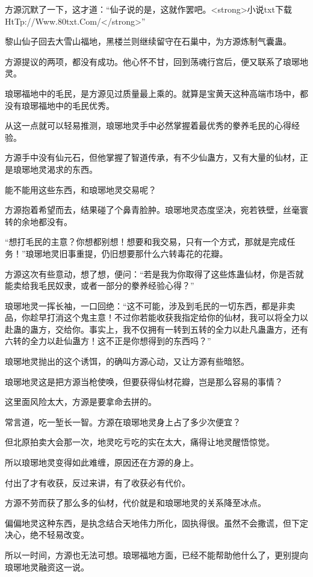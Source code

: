 \begin{this_body}
方源沉默了一下，这才道：“仙子说的是，这就作罢吧。<strong>小说txt下载HtTp://Www.80txt.Com/</strong>”

黎山仙子回去大雪山福地，黑楼兰则继续留守在石巢中，为方源炼制气囊蛊。

方源提议的两项，都没有成功。他心怀不甘，回到荡魂行宫后，便又联系了琅琊地灵。

琅琊福地中的毛民，是方源见过质量最上乘的。就算是宝黄天这种高端市场中，都没有琅琊福地中的毛民优秀。

从这一点就可以轻易推测，琅琊地灵手中必然掌握着最优秀的豢养毛民的心得经验。

方源手中没有仙元石，但他掌握了智道传承，有不少仙蛊方，又有大量的仙材，正是琅琊地灵渴求的东西。

能不能用这些东西，和琅琊地灵交易呢？

方源抱着希望而去，结果碰了个鼻青脸肿。琅琊地灵态度坚决，宛若铁壁，丝毫寰转的余地都没有。

“想打毛民的主意？你想都别想！想要和我交易，只有一个方式，那就是完成任务！”琅琊地灵旧事重提，仍旧想要那什么六转毒花的花瓣。

方源这次有些意动，想了想，便问：“若是我为你取得了这些炼蛊仙材，你是否就能卖给我毛民奴隶，或者一部分的豢养经验心得？”

琅琊地灵一挥长袖，一口回绝：“这不可能，涉及到毛民的一切东西，都是非卖品，你趁早打消这个鬼主意！不过你若能收获我指定给你的仙材，我可以将全力以赴蛊的蛊方，交给你。事实上，我不仅拥有一转到五转的全力以赴凡蛊蛊方，还有六转的全力以赴仙蛊方！这不正是你想得到的东西吗？”

琅琊地灵抛出的这个诱饵，的确叫方源心动，又让方源有些暗怒。

琅琊地灵这是把方源当枪使唤，但要获得仙材花瓣，岂是那么容易的事情？

这里面风险太大，方源是要拿命去拼的。

常言道，吃一堑长一智。方源在琅琊地灵身上占了多少次便宜？

但北原拍卖大会那一次，地灵吃亏吃的实在太大，痛得让地灵醒悟惊觉。

所以琅琊地灵变得如此难缠，原因还在方源的身上。

付出了才有收获，反过来讲，有了收获必有代价。

方源不劳而获了那么多的仙材，代价就是和琅琊地灵的关系降至冰点。

偏偏地灵这种东西，是执念结合天地伟力所化，固执得很。虽然不会撒谎，但下定决心，绝不轻易改变。

所以一时间，方源也无法可想。琅琊福地方面，已经不能帮助他什么了，更别提向琅琊地灵融资这一说。


\end{this_body}
